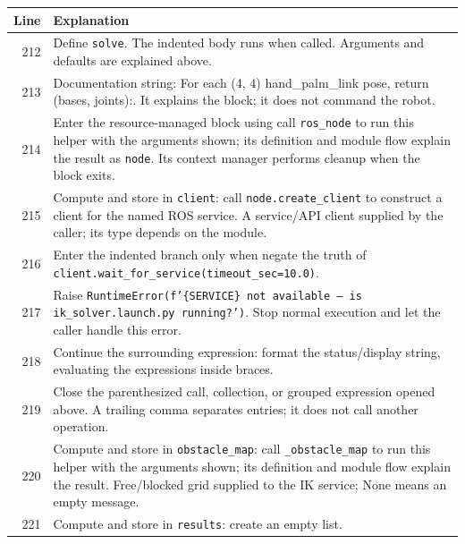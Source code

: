 \documentclass[11pt,a4paper]{book}
\begin{document}
\begin{longtable}{r p{}}

\textbf{Line} & \textbf{Explanation} \\ \hline \endhead

212 & Define \texttt{solve}. The indented body runs when called. Arguments and defaults are explained above. \\

213 & Documentation string: For each (4, 4) hand\_palm\_link pose, return (bases, joints):. It explains the block; it does not command the robot. \\

214 & Enter the resource-managed block using call \texttt{ros\_node} to run this helper with the arguments shown; its definition and module flow explain the result as \texttt{node}. Its context manager performs cleanup when the block exits. \\

215 & Compute and store in \texttt{client}: call \texttt{node.create\_client} to construct a client for the named ROS service. A service/API client supplied by the caller; its type depends on the module. \\

216 & Enter the indented branch only when negate the truth of \texttt{client.wait\_for\_service(timeout\_sec=10.0)}. \\

217 & Raise \texttt{RuntimeError(f'\{SERVICE\} not available -- is ik\_solver.launch.py running?')}. Stop normal execution and let the caller handle this error. \\

218 & Continue the surrounding expression: format the status/display string, evaluating the expressions inside braces. \\

219 & Close the parenthesized call, collection, or grouped expression opened above. A trailing comma separates entries; it does not call another operation. \\

220 & Compute and store in \texttt{obstacle\_map}: call \texttt{\_obstacle\_map} to run this helper with the arguments shown; its definition and module flow explain the result. Free/blocked grid supplied to the IK service; None means an empty message. \\

221 & Compute and store in \texttt{results}: create an empty list.  \\


\end{longtable}
\end{document}
